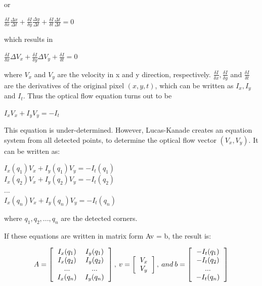 or

\begin{center}
\large
$\frac{\delta I}{\delta x}\frac{\Delta x}{\Delta t} + \frac{\delta I}{\delta y}\frac{\Delta y}{\Delta t} + \frac{\delta I}{\delta t}\frac{\Delta t}{\Delta t} = 0$
\normalsize
\end{center}

which results in 

\begin{center}
\large
$\frac{\delta I}{\delta x}\Delta V_x + \frac{\delta I}{\delta y}\Delta V_y + \frac{\delta I}{\delta t} = 0$
\normalsize
\end{center}

where $V_x$ and $V_y$ are the velocity in x and y direction, respectively. $\frac{\delta I}{\delta x}, \frac{\delta I}{\delta y}$ and $\frac{\delta I}{\delta t}$ are the derivatives of the original pixel $(x, y, t)$, which can be written as $I_x, I_y$ and $I_t$.
Thus the optical flow equation turns out to be

\begin{center}
\large
$I_x V_x + I_y V_y = -I_t$
\normalsize
\end{center}

This equation is under-determined. However, Lucas-Kanade creates an equation system from all detected points, to determine the optical flow vector $(V_x, V_y)$. It can be written as: 

\begin{center}
\large
$I_x(q_1) V_x + I_y(q_1) V_y = -I_t(q_1)$\\
$I_x(q_2) V_x + I_y(q_2) V_y = -I_t(q_2)$\\
...\\
$I_x(q_n) V_x + I_y(q_n) V_y = -I_t(q_n)$
\normalsize
\end{center}

where $q_1, q_2, ..., q_n$ are the detected corners.

If these equations are written in matrix form Av = b, the result is: 

\[ 
A=
\left[
  \begin{tabular}{cc}
  $I_x(q_1)$ & $I_y(q_1)$ \\
  $I_x(q_2)$ & $I_y(q_2)$ \\
  ... & ... \\
  $I_x(q_n)$ & $I_y(q_n)$ \\
  \end{tabular}
\right],\:
v =
\left[
	\begin{tabular}{c}
	$V_x$\\
	$V_y$
	\end{tabular}
\right],\:
and\: b = 
\left[
	\begin{tabular}{c}
	$-I_t(q_1)$\\
	$-I_t(q_2)$\\
	...\\
	$-I_t(q_n)$\\
	\end{tabular}
\right]
\]

